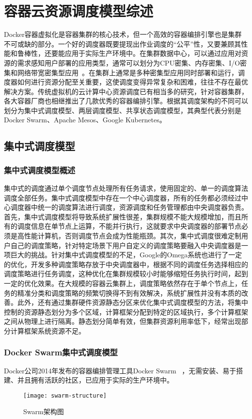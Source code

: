 \chapter{容器云资源调度模型综述}
Docker容器虚拟化是容器集群的核心技术，但一个高效的容器编排引擎也是集群不可或缺的部分。一个好的调度器既要提现出作业调度的“公平”性，又要兼顾其性能和鲁棒性，还要能应用于实际生产环境中。在集群数据中心，可以通过应用对资源的需求感知用户部署的应用类型，通常可以划分为CPU密集、内存密集、I/O密集和网络带宽密集型应用~\cite{Peng2016Research,Shuangke2017SchedulingStrategy}。在集群上通常是多种密集型应用同时部署和运行，调度器如何进行资源分配至关重要，这使调度变得异常复杂和困难，往往不存在最优解决方案。传统虚拟机的云计算中心资源调度已有相当多的研究，针对容器集群，各大容器厂商也相继推出了几款优秀的容器编排引擎。根据其调度架构的不同可以划分为集中式调度模型、两层调度模型、共享状态调度模型，其典型代表分别是Docker Swarm、Apache Mesos、Google Kubernetes。

\section{集中式调度模型}
\subsection{集中式调度模型概述}
集中式的调度通过单个调度节点处理所有任务请求，使用固定的、单一的调度算法调度全部任务。集中式调度模型中存在一个中心调度器，所有的任务都必须经过中心调度器中统一的调度算法进行调度，资源调度和任务管理都由中央调度器负责。首先，集中式调度模型将导致系统扩展性很差，集群规模不能大规模增加，而且所有的调度信息在单节点上运算，不能并行执行，这就要求中央调度器的部署节点必须是高性能计算机，否则调度节点会成为性能瓶颈。其次，集中式调度很难定制用户自己的调度策略，针对特定场景下用户自定义的调度策略要融入中央调度器是一项巨大的挑战。针对集中式调度模型的不足，Google的Omega系统也进行了一定的优化，开发多种调度策略存放于中央调度器中，根据不同的调度任务选择相应的调度策略进行任务调度，这种优化在集群规模较小时能够缩短任务执行时间，起到一定的优化效果。在大规模的容器云集群上，调度策略依然存在于单个节点上，任务的精准分类和调度策略的频繁切换得不到有效解决，系统扩展性并没有本质的改善。此外，还有通过集群硬件资源静态分区来优化集中式调度模型的方法，将集中控制的资源静态划分为多个区域，计算框架分配到特定的区域执行，多个计算框架之间从物理上进行隔离。静态划分简单有效，但集群资源利用率低下，经常出现部分计算框架系统资源不足。

\subsection{Docker Swarm集中式调度模型}
Docker公司2014年发布的容器编排管理工具Docker Swarm~\cite{Jansen2016Employing,Naik2016Building} ，无需安装、易于搭建、并且拥有活跃的社区，已应用于实际的生产环境中。
\begin{figure}[H] %
	\centering
	\texttt{[image: swarm-structure]}
	\caption{Swarm架构图}
\end{figure}

